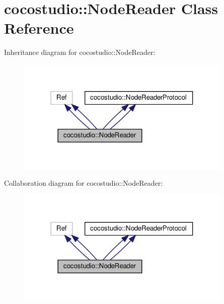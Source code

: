 \hypertarget{classcocostudio_1_1NodeReader}{}\section{cocostudio\+:\+:Node\+Reader Class Reference}
\label{classcocostudio_1_1NodeReader}


Inheritance diagram for cocostudio\+:\+:Node\+Reader\+:
\nopagebreak
\begin{figure}[H]
\begin{center}
\leavevmode
\includegraphics[width=292pt]{classcocostudio_1_1NodeReader__inherit__graph}
\end{center}
\end{figure}


Collaboration diagram for cocostudio\+:\+:Node\+Reader\+:
\nopagebreak
\begin{figure}[H]
\begin{center}
\leavevmode
\includegraphics[width=292pt]{classcocostudio_1_1NodeReader__coll__graph}
\end{center}
\end{figure}
